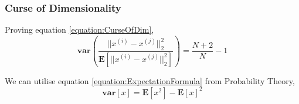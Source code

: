 \documentclass[a4paper,12pt]{article}
\begin{document}


\subsubsection{Curse of Dimensionality}

Proving equation \ref{equation:CurseOfDim},
\begin{equation}
\label{equation:CurseOfDim}
\mathbf{var}(\frac{||x^{(i)} - x^{(j)}||_{2}^{2}}{\mathbf{E}[||x^{(i)} - x^{(j)}||_{2}^{2}] }) = \frac{N + 2}{N} - 1
\end{equation} 

We can utilise equation \ref{equation:ExpectationFormula} from  Probability Theory,
\begin{equation}
\label{equation:ExpectationFormula}
\mathbf{var}[x] = \mathbf{E}[x^{2}] - \mathbf{E}[x]^{2}
\end{equation} 
\end{document}
